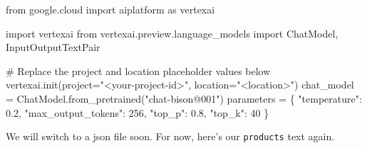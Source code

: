 \documentclass[
  letterpaper,
  DIV=11,
  numbers=noendperiod]{scrreprt}
\newenvironment{Shaded}{\begin{snugshade}}{\end{snugshade}}
\newcommand{\CommentTok}[1]{\textcolor[rgb]{0.37,0.37,0.37}{#1}}
\newcommand{\DecValTok}[1]{\textcolor[rgb]{0.68,0.00,0.00}{#1}}
\newcommand{\FloatTok}[1]{\textcolor[rgb]{0.68,0.00,0.00}{#1}}
\newcommand{\ImportTok}[1]{\textcolor[rgb]{0.00,0.46,0.62}{#1}}
\newcommand{\NormalTok}[1]{\textcolor[rgb]{0.00,0.23,0.31}{#1}}
\newcommand{\OperatorTok}[1]{\textcolor[rgb]{0.37,0.37,0.37}{#1}}
\newcommand{\StringTok}[1]{\textcolor[rgb]{0.13,0.47,0.30}{#1}}
\begin{document}
\begin{Shaded}
\begin{Highlighting}[]
\ImportTok{from}\NormalTok{ google.cloud }\ImportTok{import}\NormalTok{ aiplatform }\ImportTok{as}\NormalTok{ vertexai}
\end{Highlighting}
\end{Shaded}

\begin{Shaded}
\begin{Highlighting}[]
\ImportTok{import}\NormalTok{ vertexai}
\ImportTok{from}\NormalTok{ vertexai.preview.language\_models }\ImportTok{import}\NormalTok{ ChatModel, InputOutputTextPair}

\CommentTok{\# Replace the project and location placeholder values below}
\NormalTok{vertexai.init(project}\OperatorTok{=}\StringTok{"\textless{}your{-}project{-}id\textgreater{}"}\NormalTok{, location}\OperatorTok{=}\StringTok{"\textless{}location\textgreater{}"}\NormalTok{)}
\NormalTok{chat\_model }\OperatorTok{=}\NormalTok{ ChatModel.from\_pretrained(}\StringTok{"chat{-}bison@001"}\NormalTok{)}
\NormalTok{parameters }\OperatorTok{=}\NormalTok{ \{}
    \StringTok{"temperature"}\NormalTok{: }\FloatTok{0.2}\NormalTok{,}
    \StringTok{"max\_output\_tokens"}\NormalTok{: }\DecValTok{256}\NormalTok{,}
    \StringTok{"top\_p"}\NormalTok{: }\FloatTok{0.8}\NormalTok{,}
    \StringTok{"top\_k"}\NormalTok{: }\DecValTok{40}
\NormalTok{\}}
\end{Highlighting}
\end{Shaded}

We will switch to a json file soon. For now, here's our
\texttt{products} text again.
\end{document}
